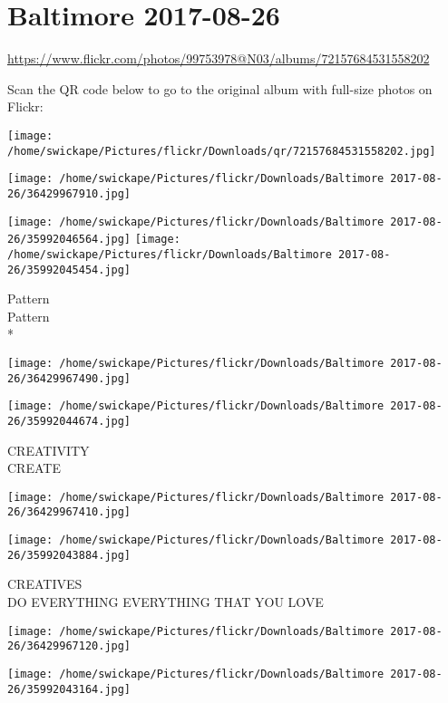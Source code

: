 \documentclass[10pt,letterpaper]{article}
\title{}
\author{}
\date{}
\begin{document}
\section*{Baltimore 2017-08-26}

\url{https://www.flickr.com/photos/99753978@N03/albums/72157684531558202}

Scan the QR code below to go to the original album with full-size photos on Flickr:

\texttt{[image: /home/swickape/Pictures/flickr/Downloads/qr/72157684531558202.jpg]}
\pagebreak

\texttt{[image: /home/swickape/Pictures/flickr/Downloads/Baltimore 2017-08-26/36429967910.jpg]}

\vspace{0.25in}
\texttt{[image: /home/swickape/Pictures/flickr/Downloads/Baltimore 2017-08-26/35992046564.jpg]}
\texttt{[image: /home/swickape/Pictures/flickr/Downloads/Baltimore 2017-08-26/35992045454.jpg]}

Pattern\\
Pattern\\
*
\pagebreak

\texttt{[image: /home/swickape/Pictures/flickr/Downloads/Baltimore 2017-08-26/36429967490.jpg]}

\vspace{0.25in}
\texttt{[image: /home/swickape/Pictures/flickr/Downloads/Baltimore 2017-08-26/35992044674.jpg]}

CREATIVITY\\
CREATE
\pagebreak

\texttt{[image: /home/swickape/Pictures/flickr/Downloads/Baltimore 2017-08-26/36429967410.jpg]}

\vspace{0.25in}
\texttt{[image: /home/swickape/Pictures/flickr/Downloads/Baltimore 2017-08-26/35992043884.jpg]}

CREATIVES\\
DO EVERYTHING EVERYTHING THAT YOU LOVE
\pagebreak

\texttt{[image: /home/swickape/Pictures/flickr/Downloads/Baltimore 2017-08-26/36429967120.jpg]}

\vspace{0.25in}
\texttt{[image: /home/swickape/Pictures/flickr/Downloads/Baltimore 2017-08-26/35992043164.jpg]}
\end{document}
